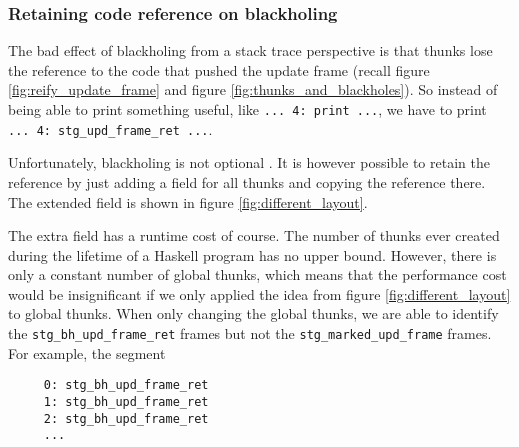 \subsubsection{Retaining code reference on blackholing}

The bad effect of blackholing from a stack trace perspective is
that thunks lose the reference to the code that pushed the update frame (recall figure \ref{fig:reify_update_frame} and figure \ref{fig:thunks_and_blackholes}). So instead
of being able to print something useful, like  \texttt{... 4: print ...},
we have to print \texttt{... 4: stg\_upd\_frame\_ret ...}.

Unfortunately, blackholing is not optional
\cite{github_blackholing_not_optional}. It is however possible to
retain the reference by just adding a field for all thunks and
copying the reference there. The extended field is shown in figure
\ref{fig:different_layout}.

\begin{figure}
\end{figure}

The extra field has a runtime cost of course. The number of thunks
ever created during the lifetime of a Haskell program has no upper bound. However,
there is only a constant number of global thunks, which means that the
performance cost would be insignificant if we only applied the idea from
figure \ref{fig:different_layout} to global thunks. When
only changing the global thunks, we are able to identify
the \texttt{stg\_bh\_upd\_frame\_ret} frames but not the
\texttt{stg\_marked\_upd\_frame} frames. For example, the
segment

\begin{verbatim}
     0: stg_bh_upd_frame_ret
     1: stg_bh_upd_frame_ret
     2: stg_bh_upd_frame_ret
     ...
\end{verbatim}

